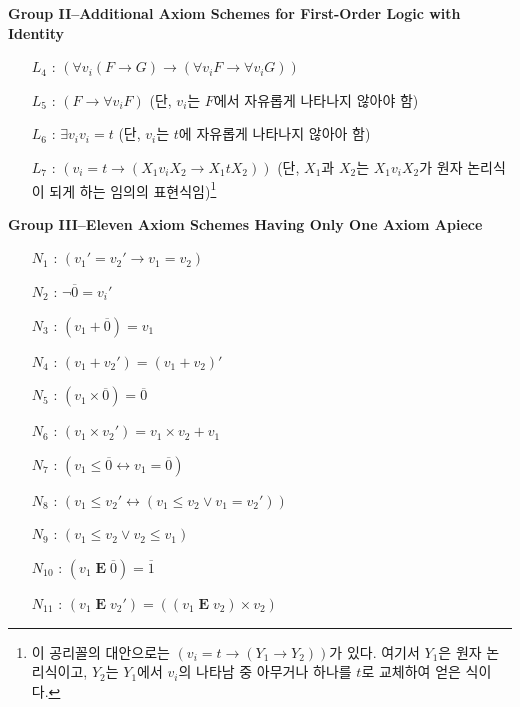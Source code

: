 \documentclass[12pt]{paper}
\begin{document}
\noindent \textbf{Group II--Additional Axiom Schemes for First-Order Logic with Identity}
\begin{enumerate}
\item[$L_{4}$ :] $\left( \forall v_i \left( F \rightarrow G \right) \rightarrow \left( \forall v_i F \rightarrow \forall v_i G \right) \right)$
\item[$L_{5}$ :] $\left( F \rightarrow \forall v_i F \right)$ (단, $v_i$는 $F$에서 자유롭게 나타나지 않아야 함)
\item[$L_{6}$ :] $\exists v_i v_i = t$ (단, $v_i$는 $t$에 자유롭게 나타나지 않아아 함)
\item[$L_{7}$ :] $\left( v_i = t \rightarrow \left( X_1 v_i X_2 \rightarrow X_1 t X_2 \right) \right)$ (단, $X_1$과 $X_2$는 $X_1 v_i X_2$가 원자 논리식이 되게 하는 임의의 표현식임)\footnote
{
이 공리꼴의 대안으로는 $\left( v_i = t \rightarrow \left( Y_1 \rightarrow Y_2 \right) \right)$가 있다.
여기서 $Y_1$은 원자 논리식이고, $Y_2$는 $Y_1$에서 $v_i$의 나타남 중 아무거나 하나를 $t$로 교체하여 얻은 식이다.
}
\end{enumerate}

\noindent \textbf{Group III--Eleven Axiom Schemes Having Only One Axiom Apiece}
\begin{enumerate}
\item[$N_{1}$ :] $\left( v_1 ' = v_2 ' \rightarrow v_1 = v_2 \right)$
\item[$N_{2}$ :] $\lnot \overline{0} = v_i '$
\item[$N_{3}$ :] $\left( v_1 + \overline{0} \right) = v_1$
\item[$N_{4}$ :] $\left( v_1 + v_2 ' \right) = \left( v_1 + v_2 \right) '$
\item[$N_{5}$ :] $\left( v_1 \times \overline{0} \right) = \overline{0}$
\item[$N_{6}$ :] $\left( v_1 \times v_2 ' \right) = v_1 \times v_2 + v_1$
\item[$N_{7}$ :] $\left( v_1 \leq \overline{0} \leftrightarrow v_1 = \overline{0} \right)$
\item[$N_{8}$ :] $\left( v_1 \leq v_2 ' \leftrightarrow \left( v_1 \leq v_2 \lor v_1 = v_2 ' \right) \right)$
\item[$N_{9}$ :] $\left( v_1 \leq v_2 \lor v_2 \leq v_1 \right)$
\item[$N_{10}$ :] $\left( v_1 \mathop{\mathbf{E}} \overline{0} \right) = \overline{1}$
\item[$N_{11}$ :] $\left( v_1 \mathop{\mathbf{E}} v_2 ' \right) = \left( \left( v_1 \mathop{\mathbf{E}} v_2 \right) \times v_2 \right)$ 
\end{enumerate}
\end{document}
